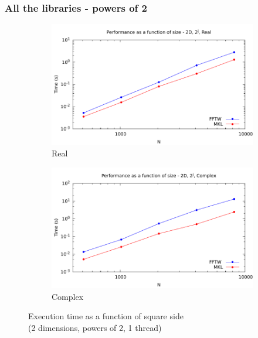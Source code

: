 \documentclass[12pt, a4paper]{article}
\begin{document}
\subsubsection{All the libraries - powers of 2}
\begin{figure}[H]
\captionsetup{width=0.8\linewidth}
\centering
\begin{subfigure}{.5\textwidth}
\centering
\includegraphics[width=.9\linewidth]{graphs/performance/2d-pow2-r.pdf}
\caption{Real}
\label{2DPOW2R}
\end{subfigure}%
\begin{subfigure}{.5\textwidth}
\centering
\includegraphics[width=.9\linewidth]{graphs/performance/2d-pow2-c.pdf}
\caption{Complex}
\label{2DPOW2C}
\end{subfigure}
\caption{Execution time as a function of square side\\(2 dimensions, powers of 2, 1 thread)}
\label{2DPOW2}
\end{figure}
\end{document}
